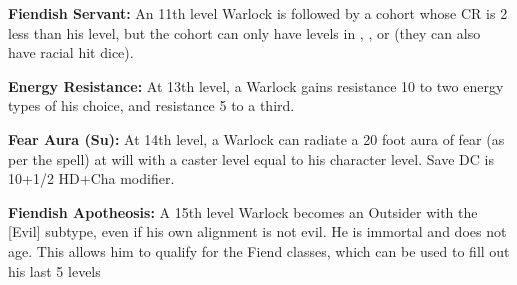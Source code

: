 \textbf{Fiendish Servant:} An 11th level Warlock is followed by a cohort whose CR is 2 less than his level, but the cohort can only have levels in , , or  (they can also have racial hit dice).

\textbf{Energy Resistance:} At 13th level, a Warlock gains resistance 10 to two energy types of his choice, and resistance 5 to a third.

\textbf{Fear Aura (Su):} At 14th level, a Warlock can radiate a 20 foot aura of fear (as per the spell) at will with a caster level equal to his character level. Save DC is 10+1/2 HD+Cha modifier.

\textbf{Fiendish Apotheosis:} A 15th level Warlock becomes an Outsider with the [Evil] subtype, even if his own alignment is not evil. He is immortal and does not age. This allows him to qualify for the Fiend classes, which can be used to fill out his last 5 levels